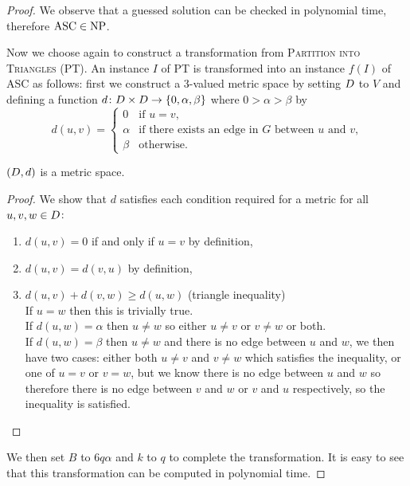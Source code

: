 \begin{proof}
  We observe that a guessed solution can be checked in polynomial time,
  therefore $\text{ASC} \in \text{NP}$.

  Now we choose again to construct a transformation from \textsc{Partition
    into Triangles} (PT).  An instance $I$ of PT is transformed into an
  instance $f(I)$ of ASC as follows: first we construct a 3-valued metric
  space by setting $D$ to $V$ and defining a function $d \colon D
  \times D \to \{0,\alpha,\beta\}$ where $0 > \alpha > \beta$ by
  \begin{equation*}
    d(u,v) = \begin{cases}
      0 & \text{if $u=v$,}\\
      \alpha & \text{if there exists an edge in $G$ between $u$ and $v$,}\\
      \beta & \text{otherwise.}
    \end{cases}
  \end{equation*}

  \begin{lem}
    \label{lem:3-val-met}
    $(D,d)$ is a metric space.
  \end{lem}
  
  \begin{proof}
    We show that $d$ satisfies each condition required for a metric for all
    $u,v,w \in D$:
    \begin{enumerate}
    \item $d(u,v)=0$ if and only if $u=v$ by definition,
    \item $d(u,v)=d(v,u)$ by definition,
    \item $d(u,v)+d(v,w) \geq d(u,w)$ (triangle inequality)\\
      If $u=w$ then this is trivially true.\\
      If $d(u,w)=\alpha$ then $u \neq w$ so either $u \neq v$ or $v \neq w$ or
      both.\\
      If $d(u,w)=\beta$ then $u \neq w$ and there is no edge between $u$ and
      $w$, we then have two cases: either both $u \neq v$ and $v \neq w$ which
      satisfies the inequality, or one of $u=v$ or $v=w$, but we know there is
      no edge between $u$ and $w$ so therefore there is no edge between $v$
      and $w$ or $v$ and $u$ respectively, so the inequality is satisfied.
    \end{enumerate}
  \end{proof}

  We then set $B$ to $6q\alpha$ and $k$ to $q$ to complete the transformation.
  It is easy to see that this transformation can be computed in polynomial
  time.


\end{proof}
